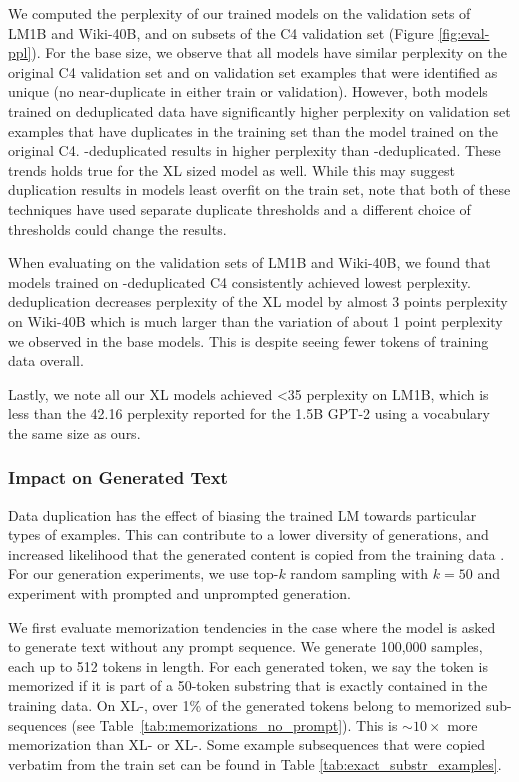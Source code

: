 We computed the perplexity of our trained models on the validation sets of LM1B and Wiki-40B, and on subsets of the C4 validation set (Figure \ref{fig:eval-ppl}).
For the base size, we observe that all models have similar perplexity on the original C4 validation set and on validation set examples that were identified as unique (no near-duplicate in either train or validation).
However, both models trained on deduplicated data have significantly higher perplexity on validation set examples that have duplicates in the training set than the model trained on the original C4. \Exact-deduplicated results in higher perplexity than \Approx-deduplicated.
These trends holds true for the XL sized model as well.
While this may suggest \Exact{} duplication results in models least overfit on the train set, note that both of these techniques have
used separate duplicate thresholds and a different choice of thresholds could change the results.

When evaluating on the validation sets of LM1B and Wiki-40B, we found that models trained on \Approx-deduplicated C4 consistently achieved lowest perplexity.
\Exact{} deduplication decreases perplexity of the XL model by almost 3 points perplexity on Wiki-40B which is much larger than the variation of about 1 point perplexity we observed in the base models.
This is despite seeing fewer tokens of training data overall.

Lastly, we note all our XL models achieved  <35 perplexity on LM1B, which is less than the 42.16 perplexity reported for the 1.5B GPT-2 using a vocabulary the same size as ours.


\subsubsection{Impact on Generated Text}
\label{sec:memorization-results}
Data duplication has the effect of biasing the trained LM towards particular types of examples. 
This can contribute to a lower diversity of generations, and increased likelihood that the generated content is copied from the training data \citep{carlini2020extracting}.
For our generation experiments, we use top-$k$ random sampling with $k=50$ and experiment with prompted and unprompted generation.


We first evaluate memorization tendencies in the case where the model is asked to generate text without any prompt sequence.
We generate 100,000 samples, each up to 512 tokens in length.
For each generated token, we say the token is memorized if it is part of a 50-token substring that is exactly contained in the training data.
On XL-\Original, over 1\% of the generated tokens belong to memorized sub-sequences (see Table~\ref{tab:memorizations_no_prompt}).
This is $\sim10\times$ more memorization than XL-\Exact{} or XL-\Approx.
Some example subsequences that were copied verbatim from the train set can be found in Table \ref{tab:exact_substr_examples}.


